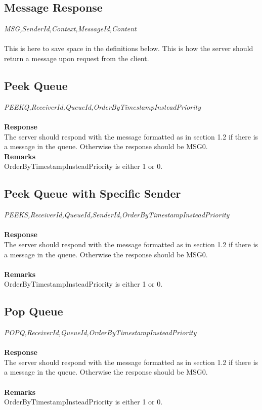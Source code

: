 \documentclass{article}
\begin{document}
            \subsection{Message Response}
                \indent\indent\textit{MSG,SenderId,Context,MessageId,Content}\\
                \\
                This is here to save space in the definitions below. This is how the server should return a message upon request from the client.

            \subsection{Peek Queue}
                \indent\indent \textit{PEEKQ,ReceiverId,QueueId,OrderByTimestampInsteadPriority}\\
                \\
                \textbf{Response}\\
                The server should respond with the message formatted as in section 1.2 if there is a message in the queue. Otherwise the response should be MSG0.\\
                \textbf{Remarks}\\
                OrderByTimestampInsteadPriority is either 1 or 0.

            \subsection{Peek Queue with Specific Sender}
                \indent\indent\textit{PEEKS,ReceiverId,QueueId,SenderId,OrderByTimestampInsteadPriority}\\
            \\
            \textbf{Response}\\
            The server should respond with the message formatted as in section 1.2 if there is a message in the queue. Otherwise the response should be MSG0.\\
            \\
            \textbf{Remarks}\\
            OrderByTimestampInsteadPriority is either 1 or 0.


            \subsection{Pop Queue}
                \indent\indent\textit{POPQ,ReceiverId,QueueId,OrderByTimestampInsteadPriority}\\
                \\
                \textbf{Response}\\
                The server should respond with the message formatted as in section 1.2 if there is a message in the queue. Otherwise the response should be MSG0.\\
                \\
                \textbf{Remarks}\\
                OrderByTimestampInsteadPriority is either 1 or 0.
\end{document}
